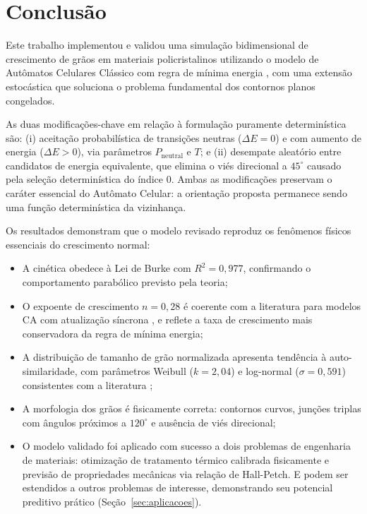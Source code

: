 \documentclass[12pt,a4paper]{article}
\begin{document}
\newpage

\section{Conclusão}

Este trabalho implementou e validou uma simulação bidimensional de crescimento de
grãos em materiais policristalinos utilizando o modelo de Autômatos Celulares
Clássico com regra de mínima energia \cite{he2006, raghavan2007}, com uma extensão
estocástica que soluciona o problema fundamental dos contornos planos congelados.

As duas modificações-chave em relação à formulação puramente determinística são:
(i) aceitação probabilística de transições neutras ($\Delta E = 0$) e com aumento
de energia ($\Delta E > 0$), via parâmetros $P_{\text{neutral}}$ e $T$; e
(ii) desempate aleatório entre candidatos de energia equivalente, que elimina o
viés direcional a $45^\circ$ causado pela seleção determinística do índice 0.
Ambas as modificações preservam o caráter essencial do Autômato Celular: a
orientação proposta permanece sendo uma função determinística da vizinhança.

Os resultados demonstram que o modelo revisado reproduz os fenômenos físicos
essenciais do crescimento normal:
\begin{itemize}
    \item A cinética obedece à Lei de Burke com $R^2 = 0{,}977$, confirmando o
          comportamento parabólico previsto pela teoria;
    \item O expoente de crescimento $n = 0{,}28$ é coerente com a literatura para
          modelos CA com atualização síncrona \cite{raghavan2007, janssens2010},
          e reflete a taxa de crescimento mais conservadora da regra de mínima
          energia;
    \item A distribuição de tamanho de grão normalizada apresenta tendência à
          auto-similaridade, com parâmetros Weibull ($k = 2{,}04$) e log-normal
          ($\sigma = 0{,}591$) consistentes com a literatura \cite{wang2023, he2006};
    \item A morfologia dos grãos é fisicamente correta: contornos curvos, junções
          triplas com ângulos próximos a $120^\circ$ e ausência de viés direcional;
    \item O modelo validado foi aplicado com sucesso a dois problemas de engenharia
          de materiais: otimização de tratamento térmico calibrada fisicamente e
          previsão de propriedades mecânicas via relação de Hall-Petch. E podem ser estendidos a outros problemas de interesse,
          demonstrando seu potencial preditivo prático (Seção~\ref{sec:aplicacoes}).
\end{itemize}
\end{document}
